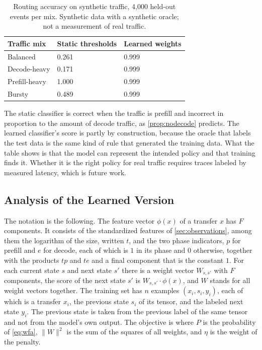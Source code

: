 \begin{table}[htbp]
  \centering
  \caption[Routing accuracy on synthetic traffic, 4,000 held-out events per mix]{Routing accuracy on synthetic traffic, 4,000 held-out events per mix. Synthetic data with a synthetic oracle; not a measurement of real traffic.}
  \label{tab:wfa}
  \small
  \begin{tabular}{L{4.6cm}L{3.2cm}L{3.2cm}}
    \toprule
    Traffic mix & Static thresholds & Learned weights \\
    \midrule
    Balanced & 0.261 & 0.999 \\
    Decode-heavy & 0.171 & 0.999 \\
    Prefill-heavy & 1.000 & 0.999 \\
    Bursty & 0.489 & 0.999 \\
    \bottomrule
  \end{tabular}
\end{table}

The static classifier is correct when the traffic is prefill and incorrect in proportion to the amount of decode traffic, as \cref{prop:nodecode} predicts.
The learned classifier's score is partly by construction, because the oracle
that labels the test data is the same kind of rule that generated the
training data. What the table shows is that the model can represent the
intended policy and that training finds it. Whether it is the right policy for
real traffic requires traces labeled by measured latency, which is future
work.

\subsection{Analysis of the Learned Version}
\label{sec:proofs-wfa}

The notation is the following. The feature vector $\phi(x)$ of a transfer
$x$ has $F$ components. It consists of the standardized features of
\cref{sec:observations}, among them the logarithm of the size, written $t$,
and the two phase indicators, $p$ for prefill and $e$ for decode, each of
which is $1$ in its phase and $0$ otherwise, together with the products $t p$
and $t e$ and a final component that is the constant $1$. For each current
state $s$ and next state $s'$ there is a weight vector $W_{s,s'}$ with $F$
components, the score of the next state $s'$ is $W_{s,s'} \cdot \phi(x)$, and
$W$ stands for all weight vectors together. The training set has $n$ examples
$(x_i, s_i, y_i)$, each of which is a transfer $x_i$, the previous state
$s_i$ of its tensor, and the labeled next state $y_i$. The previous state is
taken from the previous label of the same tensor and not from the model's own
output. The objective is
where $P$ is the probability of \cref{eq:wfa}, $\lVert W \rVert^2$ is the sum
of the squares of all weights, and $\eta$ is the weight of the penalty.

